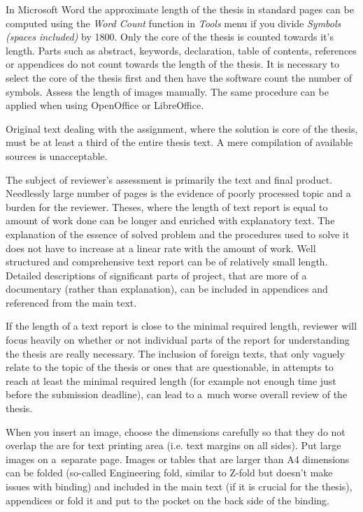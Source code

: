 In Microsoft Word the approximate length of the thesis in standard pages can be computed using the {\it Word Count} function in {\it Tools} menu if you divide {\it Symbols (spaces included)} by 1800. Only the core of the thesis is counted towards it's length. Parts such as abstract, keywords, declaration, table of contents, references or appendices do not count towards the length of the thesis. It is necessary to select the core of the thesis first and then have the software count the number of symbols. Assess the length of images manually. The same procedure can be applied when using OpenOffice or LibreOffice. 

Original text dealing with the assignment, where the solution is core of the thesis, must be at least a third of the entire thesis text. A mere compilation of available sources is unacceptable.

The subject of reviewer's assessment is primarily the text and final product.
Needlessly large number of pages is the evidence of poorly processed topic and a burden for the reviewer. Theses, where the length of text report is equal to amount of work done can be longer and enriched with explanatory text. The explanation of the essence of solved problem and the procedures used to solve it does not have to increase at a linear rate with the amount of work. Well structured and comprehensive text report can be of relatively small length. Detailed descriptions of significant parts of project, that are more of a documentary (rather than explanation), can be included in appendices and referenced from the main text.

If the length of a text report is close to the minimal required length, reviewer will focus heavily on whether or not individual parts of the report for understanding the thesis are really necessary. The inclusion of foreign texts, that only vaguely relate to the topic of the thesis or ones that are questionable, in attempts to reach at least the minimal required length (for example not enough time just before the submission deadline), can lead to a~much worse overall review of the thesis.

When you insert an image, choose the dimensions carefully so that they do not overlap the are for text printing area (i.e. text margins on all sides). Put large images on a~separate page. Images or tables that are larger than A4 dimensions can be folded (so-called Engineering fold, similar to Z-fold but doesn't make issues with binding) and included in the main text (if it is crucial for the thesis), appendices or fold it and put to the pocket on the back side of the binding.

